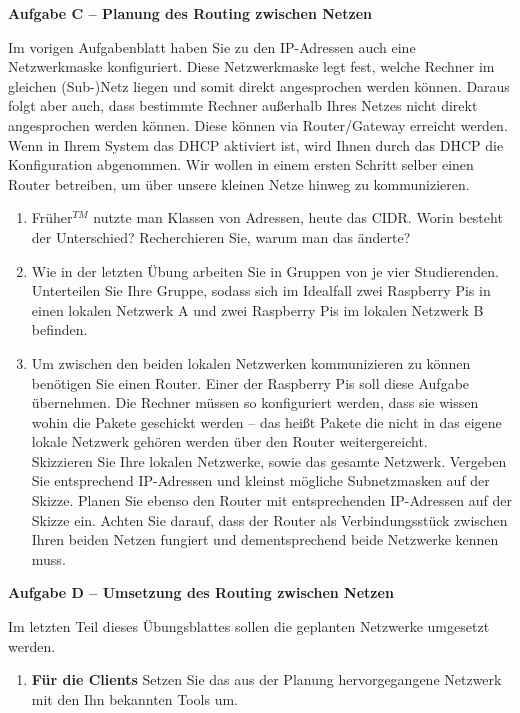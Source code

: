 \documentclass[paper=a4,fontsize=11pt]{scrartcl}%
\numberwithin{equation}{section}
\begin{document}
{\begin{center}\Large{\textbf{Aufgabe C -- Planung des Routing zwischen Netzen}}\end{center}\vskip0.25in
Im vorigen Aufgabenblatt haben Sie zu den IP-Adressen auch eine Netzwerkmaske konfiguriert. Diese Netzwerkmaske legt fest, welche Rechner im gleichen (Sub-)Netz liegen und somit direkt angesprochen werden können. Daraus folgt aber auch, dass bestimmte Rechner außerhalb Ihres Netzes nicht direkt angesprochen werden können. Diese können via Router/Gateway erreicht werden. Wenn in Ihrem System das DHCP aktiviert ist, wird Ihnen durch das DHCP die Konfiguration abgenommen. Wir wollen in einem ersten Schritt selber einen Router betreiben, um über unsere kleinen Netze hinweg zu kommunizieren.
\begin{enumerate}
	\item Früher$^{TM}$ nutzte man Klassen von Adressen, heute das CIDR. Worin besteht der Unterschied? Recherchieren Sie, warum man das änderte?
	\item Wie in der letzten Übung arbeiten Sie in Gruppen von je vier Studierenden. Unterteilen Sie Ihre Gruppe, sodass sich im Idealfall zwei Raspberry Pis in einen lokalen Netzwerk A und zwei Raspberry Pis im lokalen Netzwerk B befinden.
	\item Um zwischen den beiden lokalen Netzwerken kommunizieren zu können benötigen Sie einen Router. Einer der Raspberry Pis soll diese Aufgabe übernehmen. Die Rechner müssen so konfiguriert werden, dass sie wissen wohin die Pakete geschickt werden -- das heißt Pakete die nicht in das eigene lokale Netzwerk gehören werden über den Router weitergereicht.\\
	Skizzieren Sie Ihre lokalen Netzwerke, sowie das gesamte Netzwerk. Vergeben Sie entsprechend IP-Adressen und kleinst mögliche Subnetzmasken auf der Skizze. Planen Sie ebenso den Router mit entsprechenden IP-Adressen auf der Skizze ein. Achten Sie darauf, dass der Router als Verbindungsstück zwischen Ihren beiden Netzen fungiert und dementsprechend beide Netzwerke kennen muss.
\end{enumerate}
\begin{center}\Large{\textbf{Aufgabe D -- Umsetzung des Routing zwischen Netzen}}\end{center}\vskip0.25in
Im letzten Teil dieses Übungsblattes sollen die geplanten Netzwerke umgesetzt werden.
\begin{enumerate}
	\item \textbf{Für die Clients} Setzen Sie das aus der Planung hervorgegangene Netzwerk mit den Ihn bekannten Tools um. 

\end{enumerate}}
\end{document}
